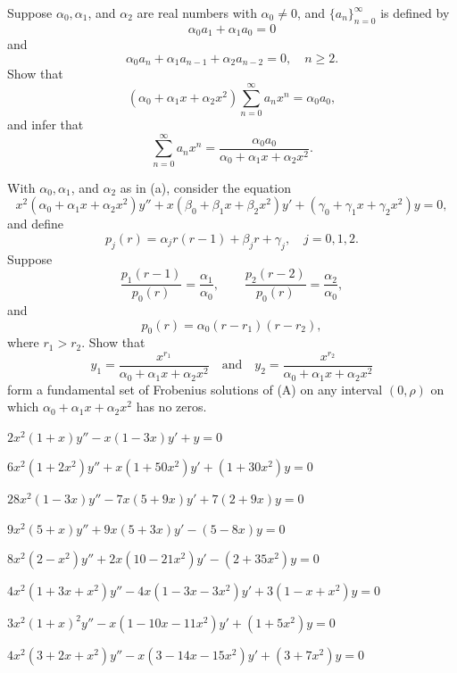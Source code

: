 \begin{exerciselist}
\item\label{exer:7.5.60}\begin{alist}
\item %
Suppose $\alpha_0,\alpha_1$, and $\alpha_2$ are real numbers with
$\alpha_0\ne0$, and  $\{a_n\}_{n=0}^\infty$ is
defined by
\[
\alpha_0a_1+\alpha_1a_0=0
\]
and
\[
\alpha_0a_n+\alpha_1a_{n-1}+\alpha_2a_{n-2}=0,\quad n\ge2.
\]
Show that
\[
(\alpha_0+\alpha_1x+\alpha_2x^2)\sum_{n=0}^\infty a_nx^n=\alpha_0a_0,
\]
and infer that
\[
\sum_{n=0}^\infty
a_nx^n=\frac{\alpha_0a_0}{\alpha_0+\alpha_1x+\alpha_2x^2}.
\]
\item %
With $\alpha_0,\alpha_1$, and $\alpha_2$ as in (a), consider the
equation
\[\tag{A}
x^2(\alpha_0+\alpha_1x+\alpha_2 x^2)y''+x(\beta_0+\beta_1x+\beta_2x^2)y'+
(\gamma_0+\gamma_1x+\gamma_2x^2)y=0,
\]
and define
\[
p_j(r)=\alpha_jr(r-1)+\beta_jr+\gamma_j,\quad j=0,1,2.
\]
Suppose
\[
\frac{p_1(r-1)}{p_0(r)}=
\frac{\alpha_1}{\alpha_0},\qquad
\frac{p_2(r-2)}{p_0(r)}=
\frac{\alpha_2}{\alpha_0},
\]
and
\[
p_0(r)=\alpha_0(r-r_1)(r-r_2),
\]
where $r_1>r_2$.  Show that
\[
y_1=\frac{x^{r_1}}{\alpha_0+\alpha_1x+\alpha_2x^2}\quad\text{and}\quad
y_2=\frac{x^{r_2}}{\alpha_0+\alpha_1x+\alpha_2x^2}
\]
form a fundamental set of  Frobenius  solutions of
(A) on any interval $(0,\rho)$ on which
$\alpha_0+\alpha_1x+\alpha_2x^2$ has no zeros.
\end{alist}


\item\label{exer:7.5.61}$2x^2(1+x)y''-x(1-3x)y'+y=0$

\item\label{exer:7.5.62}$6x^2(1+2x^2)y''+x(1+50x^2)y'+(1+30x^2)y=0$

\item\label{exer:7.5.63}$28x^2(1-3x)y''-7x(5+9x)y'+7(2+9x)y=0$

\item\label{exer:7.5.64}$9x^2(5+x)y''+9x(5+3x)y'-(5-8x)y=0$

\item\label{exer:7.5.65}$8x^2(2-x^2)y''+2x(10-21x^2)y'-(2+35x^2)y=0$

\item\label{exer:7.5.66}$4x^2(1+3x+x^2)y''-4x(1-3x-3x^2)y'+3(1-x+x^2)y=0$

\item\label{exer:7.5.67}$3x^2(1+x)^2y''-x(1-10x-11x^2)y'+(1+5x^2)y=0$

\item\label{exer:7.5.68}$4x^2(3+2x+x^2)y''-x(3-14x-15x^2)y'+(3+7x^2)y=0$

\end{exerciselist}


